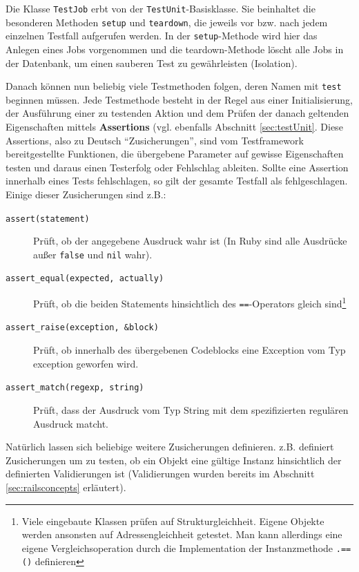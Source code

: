 Die Klasse \texttt{TestJob} erbt von der \texttt{TestUnit}-Basisklasse. Sie beinhaltet die besonderen Methoden \texttt{setup} und \texttt{teardown}, die jeweils vor bzw. nach jedem einzelnen Testfall aufgerufen werden.
In der \texttt{setup}-Methode wird hier das Anlegen eines Jobs vorgenommen und die teardown-Methode löscht alle Jobs in der Datenbank, um einen sauberen Test zu gewährleisten (Isolation).

Danach können nun beliebig viele Testmethoden folgen, deren Namen mit \texttt{test} beginnen müssen.
Jede Testmethode besteht in der Regel aus einer Initialisierung, der Ausführung einer zu testenden Aktion und dem Prüfen der danach geltenden Eigenschaften mittels \textbf{Assertions} (vgl. ebenfalls Abschnitt \ref{sec:testUnit}. Diese Assertions, also zu Deutsch "`Zusicherungen"', sind vom Testframework bereitgestellte Funktionen, die übergebene Parameter auf gewisse Eigenschaften testen und daraus einen Testerfolg oder Fehlschlag ableiten. Sollte eine Assertion innerhalb eines Tests fehlschlagen, so gilt der gesamte Testfall als fehlgeschlagen. \\
Einige dieser Zusicherungen sind z.B.:
\begin{description}
 \item[\texttt{assert(statement)}] Prüft, ob der angegebene Ausdruck wahr ist (In Ruby sind alle Ausdrücke außer \texttt{false} und \texttt{nil} wahr).
 \item[\texttt{assert\_equal(expected, actually)}] Prüft, ob die beiden Statements hinsichtlich des \texttt{==}-Operators gleich sind\footnote{Viele eingebaute Klassen prüfen auf Strukturgleichheit. Eigene Objekte werden ansonsten auf Adressengleichheit getestet. Man kann allerdings eine eigene Vergleichsoperation durch die Implementation der Instanzmethode \texttt{.==()} definieren}

 \item[\texttt{assert\_raise(exception, \&block)}] Prüft, ob innerhalb des übergebenen Codeblocks eine Exception vom Typ exception geworfen wird.
 \item[\texttt{assert\_match(regexp, string)}] Prüft, dass der Ausdruck vom Typ String mit dem spezifizierten regulären Ausdruck matcht.
\end{description}
Natürlich lassen sich beliebige weitere Zusicherungen definieren.  z.B. definiert Zusicherungen um zu testen, ob ein Objekt eine gültige Instanz hinsichtlich der definierten Validierungen ist (Validierungen wurden bereits im Abschnitt \ref{sec:railsconcepts} erläutert).


